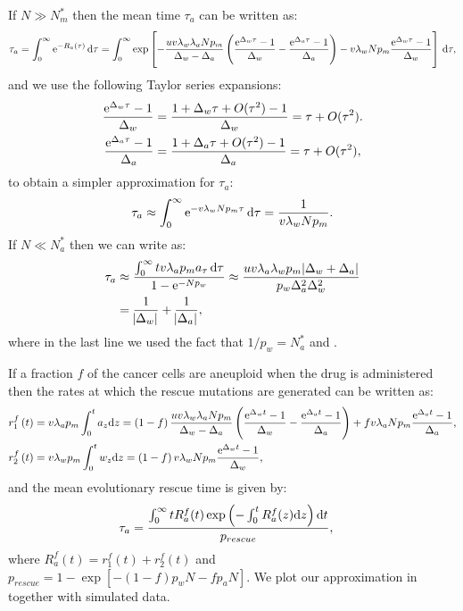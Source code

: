 \documentclass[12pt]{extarticle}
\renewcommand{\d}[1]{\ensuremath{\operatorname{d}\!{#1}}}
\renewcommand{\d}{{\rm d}}
\newcommand{\e}{{\rm e}}
\begin{document}
\begin{appendices}
If $N\gg N_m^*$ then the mean time $\tau_a$ can be written as:
\begin{align*}
\tau_a=\int_0^\infty\e^{-R_a\left(\tau\right)}\,\d\tau=\int_0^\infty\exp\left[-\frac{uv\lambda_w\lambda_aNp_m}{\Delta_w-\Delta_a}\left(\frac{\e^{\Delta_w\tau}-1}{\Delta_w}-\frac{\e^{\Delta_a\tau}-1}{\Delta_a}\right)-v\lambda_wNp_m\frac{\e^{\Delta_w\tau}-1}{\Delta_w}\right]\,\d\tau,
\end{align*}
and we use the following Taylor series expansions:
\begin{align*}
\frac{\e^{\Delta_w\tau}-1}{\Delta_w}&=\frac{1+\Delta_w\tau+O(\tau^2)-1}{\Delta_w}=\tau+O(\tau^2).\\
\frac{\e^{\Delta_a\tau}-1}{\Delta_a}&=\frac{1+\Delta_a\tau+O(\tau^2)-1}{\Delta_a}=\tau+O(\tau^2),
\end{align*}
to obtain a simpler approximation for $\tau_a$:
\begin{align}\label{limitapprox3}
\tau_a\approx\int_0^\infty\e^{-v\lambda_wNp_m\tau}\,\d\tau=\frac{1}{v\lambda_wNp_m}.
\end{align}
If $N\ll N_a^*$ then we can write  as:
\begin{align}\nonumber
\tau_a&\approx\frac{\int_0^\infty tv\lambda_ap_ma_\tau\,\d\tau}{1-\e^{-Np_w}}\approx\frac{uv\lambda_a\lambda_wp_m\abs{\Delta_w+\Delta_a}}{p_w\Delta_a^2\Delta_w^2}\\ \label{limitapprox4}
&=\frac{1}{\abs{\Delta_w}}+\frac{1}{\abs{\Delta_a}},
\end{align}
where in the last line we used the fact that $1/p_w=N_a^*$ and .

If a fraction $f$ of the cancer cells are aneuploid when the drug is administered then the rates at which the rescue mutations are generated can be written as:
\begin{align*}
r_1^f\left(t\right)&=v\lambda_ap_m\int_0^ta_{z} \d z = \left(1-f\right)\frac{uv\lambda_w\lambda_aNp_m}{\Delta_w-\Delta_a}\left(\frac{\e^{\Delta_wt}-1}{\Delta_w}-\frac{\e^{\Delta_at}-1}{\Delta_a}\right)+fv\lambda_aNp_m\frac{\e^{\Delta_a t}-1}{\Delta_a},\\ 
r_2^f\left(t\right)&=v\lambda_wp_m\int_0^tw_{z} \d z = \left(1-f\right)v\lambda_wNp_m\frac{\e^{\Delta_w t}-1}{\Delta_w},
\end{align*} 
and the mean evolutionary rescue time is given by:
\begin{align}\label{meantimet2SGV}
\tau_a &= \frac{\int_{0}^{\infty}{tR_a^f(t)\exp\left(-\int_0^{t}{R_a^f(z)\d z}\right) \d t}}{p_{rescue}},
\end{align}
where $R_a^f(t)=r_1^f\left(t\right)+r_2^f\left(t\right)$ and $p_{rescue}=1-\exp\left[-\left(1-f\right)p_wN-fp_aN\right]$. We plot our approximation in   together with simulated data.

\end{appendices}
\end{document}
